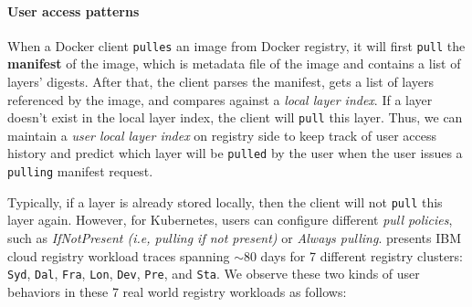 \paragraph{User access patterns} 
When a Docker client \texttt{pulles} an image from Docker registry,
it will first \texttt{pull} the \textbf{manifest} of the image, 
which is metadata file of the image and contains a list of layers' digests.
After that, the client parses the manifest, gets a list of layers referenced by the image,
and compares against a \emph{local layer index}.
If a layer doesn't exist in the local layer index,
 the client will \texttt{pull} this layer.
 Thus, we can maintain a \emph{user local layer index} on registry side to keep track of user access history
 and predict which layer will be \texttt{pulled} by the user when the user issues a \texttt{pulling} manifest request.

Typically, if a layer is already stored locally,
then the client will not \texttt{pull} this layer again.
However, for Kubernetes,
users can configure different \emph{pull policies}, 
such as \emph{IfNotPresent (i.e, pulling if not present)} or \emph{Always pulling}.
\cite{dockerworkload} presents IBM cloud registry workload traces spanning $\sim$80 days for 7 different registry clusters: \texttt{Syd}, \texttt{Dal}, \texttt{Fra}, \texttt{Lon}, \texttt{Dev}, \texttt{Pre}, and \texttt{Sta}. 
We observe these two kinds of user behaviors in these 7 real world registry workloads as follows:

